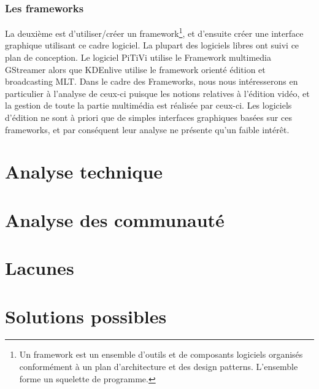 \subsubsection {Les frameworks}
    La deuxième est d'utiliser/créer un framework\footnote{Un
    framework est un ensemble d'outils et de composants logiciels
    organisés conformément à un plan d'architecture et des design
    patterns. L'ensemble forme un squelette de programme.}, et d'ensuite
    créer une interface graphique utilisant ce cadre logiciel. La
    plupart des logiciels libres ont suivi ce plan de conception. Le
    logiciel PiTiVi utilise le Framework multimedia GStreamer alors que
    KDEnlive utilise le framework orienté édition et broadcasting
    MLT. Dans le cadre des Frameworks, nous nous intéresserons en
    particulier à l'analyse de ceux-ci puisque les notions relatives à
    l'édition vidéo, et la gestion de toute la partie multimédia est
    réalisée par ceux-ci. Les logiciels d'édition ne sont à priori
    que de simples interfaces graphiques basées sur ces frameworks,
    et par conséquent leur analyse ne présente qu'un faible intérêt.


\section{Analyse technique}

\section{Analyse des communauté}

\section{Lacunes}

\section{Solutions possibles}
